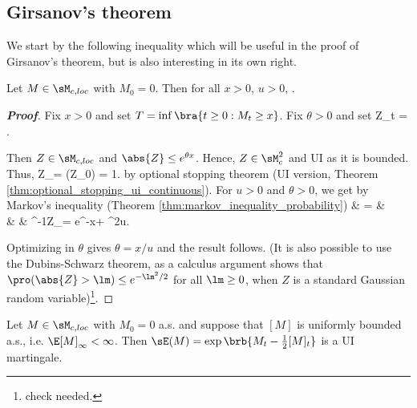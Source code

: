 \subsection{Girsanov's theorem}

We start by the following inequality which will be useful in the proof of Girsanov's theorem, but is also interesting in its own right.

\begin{proposition}\label{pro:exponential_martingale_inequality}
Let $M \in \sM_{c,loc}$ with $M_0 = 0$. Then for all $x > 0$, $u > 0$,
\be
\pro{} \leq \exp{}.
\ee
\end{proposition}
%
\begin{proof}[\bf Proof]
Fix $x > 0$ and set $T = \inf\bra{t \geq 0 : M_t \geq x}$. Fix $\theta > 0$ and set
\be
Z_t = \exp{}.
\ee

Then $Z \in\sM_{c,loc}$ and $\abs{Z} \leq e^{\theta x}$. Hence, $Z \in \sM^2_c$ and UI as it is bounded. Thus, %
\be
\E Z_\infty = \E(Z_0) = 1.
\ee
by optional stopping theorem (UI version, Theorem \ref{thm:optional_stopping_ui_continuous}). For $u > 0$ and $\theta >0$, we get by Markov's inequality (Theorem \ref{thm:markov_inequality_probability})
\beast
\pro{} & = & \pro{} \leq  \pro{} \\
& \leq & \pro{} \leq {}^{-1}\E Z_\infty = e^{-\theta x+ \theta^2u}.
\eeast

Optimizing in $\theta$  gives $\theta = x/u$ and the result follows. (It is also possible to use the Dubins-Schwarz theorem, as a calculus argument shows that $\pro(\abs{Z} > \lm) \leq e^{-\lm^2/2}$ for all $\lm \geq 0$, when $Z$ is a standard Gaussian random variable)\footnote{check needed.}.
\end{proof}


\begin{proposition}\label{pro:exponential_ui_martingale}
Let $M \in \sM_{c,loc}$ with $M_0 = 0$ a.s. and suppose that $[M]$ is uniformly bounded a.s., i.e. $\E[M]_\infty < \infty$. Then $\sE(M) = \exp\brb{M_t - \frac 12 [M]_t}$ is a UI martingale.
\end{proposition}

